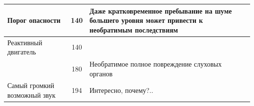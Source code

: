 \begin{center}
\begin{longtable}{|p{}|c|p{}|}
    \hline
    Порог опасности              & 140   & \small{Даже кратковременное пребывание на
    шуме большего уровня может привести к необратимым последствиям}                       \\
    \hline
    Реактивный двигатель         & 140   &                                                \\
                                 & 180   & \small{Необратимое полное повреждение
                                 слуховых органов}                                        \\
    Самый громкий возможный звук & 194   & \small{Интересно, почему?..}                   \\
  \end{longtable}
\end{center}

